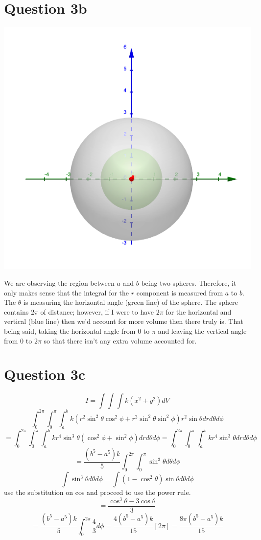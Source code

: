 \documentclass[11pt]{article}
\begin{document}
\section*{Question 3b}
\begin{center}
    \includegraphics[width=15cm]{Screen Shot 2021-09-27 at 1.04.55 AM.png}
\end{center}
We are observing the region between $a$ and $b$ being two spheres. Therefore, it only makes sense that the integral for the $r$ component is measured from $a$ to $b$. The $\theta$ is measuring the horizontal angle (green line) of the sphere. The sphere contains $2\pi$ of distance; however, if I were to have $2\pi$ for the horizontal and vertical (blue line) then we'd account for more volume then there truly is. That being said, taking the horizontal angle from $0$ to $\pi$ and leaving the vertical angle from $0$ to $2\pi$ so that there isn't any extra volume accounted for.

\newpage
\section*{Question 3c}
\[I=\int\int\int k(x^2+y^2)dV\]
\[\int^{2\pi}_0\int^{\pi}_0\int^{b}_ak(r^2\sin^2\theta\cos^2\phi+r^2\sin^2\theta\sin^2\phi)r^2\sin\theta dr d\theta d\phi\]
\[=\int^{2\pi}_0\int^{\pi}_0\int^{b}_a kr^4\sin^3\theta(\cos^2\phi + \sin^2\phi)dr d\theta d\phi=\int^{2\pi}_0\int^{\pi}_0\int^{b}_a kr^4\sin^3\theta dr d\theta d\phi\]
\[=\frac{(b^5-a^5)k}{5}\int^{2\pi}_0\int^{\pi}_0 \sin^3\theta d\theta d\phi\]
\[\int \sin^3\theta d\theta d\phi=\int (1-\cos^2\theta)\sin\theta d\theta d\phi\]
use the substitution on cos and proceed to use the power rule.
\[=\frac{\cos^3\theta-3\cos\theta}{3}\]
\[=\frac{(b^5-a^5)k}{5}\int^{2\pi}_0 \frac{4}{3} d\phi=\frac{4(b^5-a^5)k}{15}[2\pi]=
\frac{8\pi(b^5-a^5)k}{15} \]
\end{document}
